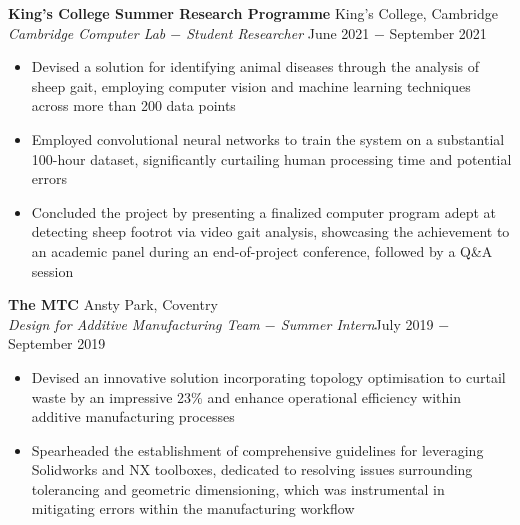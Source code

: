\documentclass{article}
\begin{document}
\textbf{King's College Summer Research Programme} \hfill King's College, Cambridge \\
\textit{Cambridge Computer Lab $-$ Student Researcher} \hfill June 2021 $-$ September 2021
\begin{itemize}
    \item Devised a solution for identifying animal diseases through the analysis of sheep gait, employing computer vision and machine learning techniques across more than 200 data points
    \item Employed convolutional neural networks to train the system on a substantial 100-hour dataset, significantly curtailing human processing time and potential errors
    \item Concluded the project by presenting a finalized computer program adept at detecting sheep footrot via video gait analysis, showcasing the achievement to an academic panel during an end-of-project conference, followed by a Q\&A session
\end{itemize} \medskip

\textbf{The MTC} \hfill Ansty Park, Coventry \\
\textit{Design for Additive Manufacturing Team $-$ Summer Intern}\hfill July 2019 $-$ September 2019
\begin{itemize}
    \item Devised an innovative solution incorporating topology optimisation to curtail waste by an impressive 23\% and enhance operational efficiency within additive manufacturing processes
    \item Spearheaded the establishment of comprehensive guidelines for leveraging Solidworks and NX toolboxes, dedicated to resolving issues surrounding tolerancing and geometric dimensioning, which was instrumental in mitigating errors within the manufacturing workflow
\end{itemize} \medskip
\end{document}
